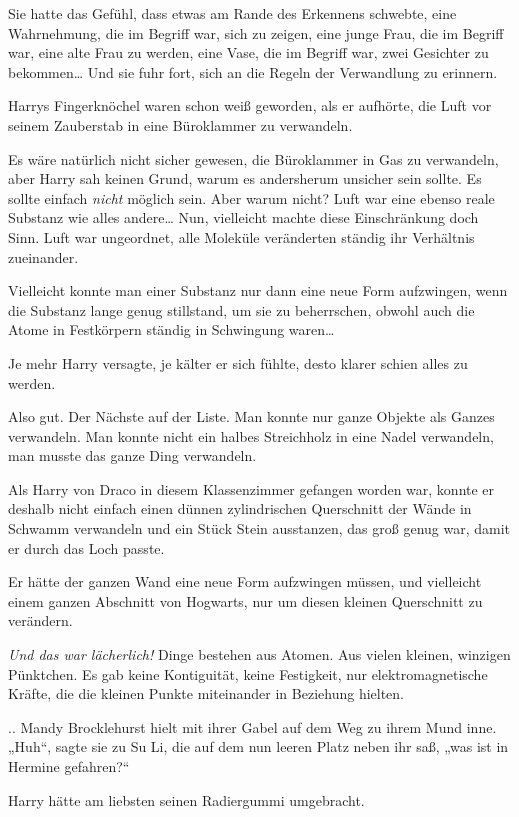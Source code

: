 {Sie hatte das Gefühl, dass etwas am Rande des Erkennens schwebte, eine Wahrnehmung, die im Begriff war, sich zu zeigen, eine junge Frau, die im Begriff war, eine alte Frau zu werden, eine Vase, die im Begriff war, zwei Gesichter zu bekommen… Und sie fuhr fort, sich an die Regeln der Verwandlung zu erinnern.

Harrys Fingerknöchel waren schon weiß geworden, als er aufhörte, die Luft vor seinem Zauberstab in eine Büroklammer zu verwandeln.

Es wäre natürlich nicht sicher gewesen, die Büroklammer in Gas zu verwandeln, aber Harry sah keinen Grund, warum es andersherum unsicher sein sollte. Es sollte einfach \emph{nicht} möglich sein. Aber warum nicht? Luft war eine ebenso reale Substanz wie alles andere… Nun, vielleicht machte diese Einschränkung doch Sinn. Luft war ungeordnet, alle Moleküle veränderten ständig ihr Verhältnis zueinander.

Vielleicht konnte man einer Substanz nur dann eine neue Form aufzwingen, wenn die Substanz lange genug stillstand, um sie zu beherrschen, obwohl auch die Atome in Festkörpern ständig in Schwingung waren…

Je mehr Harry versagte, je kälter er sich fühlte, desto klarer schien alles zu werden.

Also gut. Der Nächste auf der Liste. Man konnte nur ganze Objekte als Ganzes verwandeln. Man konnte nicht ein halbes Streichholz in eine Nadel verwandeln, man musste das ganze Ding verwandeln.

Als Harry von Draco in diesem Klassenzimmer gefangen worden war, konnte er deshalb nicht einfach einen dünnen zylindrischen Querschnitt der Wände in Schwamm verwandeln und ein Stück Stein ausstanzen, das groß genug war, damit er durch das Loch passte.

Er hätte der ganzen Wand eine neue Form aufzwingen müssen, und vielleicht einem ganzen Abschnitt von Hogwarts, nur um diesen kleinen Querschnitt zu verändern.

\emph{Und das war lächerlich!} Dinge bestehen aus Atomen. Aus vielen kleinen, winzigen Pünktchen. Es gab keine Kontiguität, keine Festigkeit, nur elektromagnetische Kräfte, die die kleinen Punkte miteinander in Beziehung hielten.

.. Mandy Brocklehurst hielt mit ihrer Gabel auf dem Weg zu ihrem Mund inne. „Huh“, sagte sie zu Su Li, die auf dem nun leeren Platz neben ihr saß, „was ist in Hermine gefahren?“

Harry hätte am liebsten seinen Radiergummi umgebracht.

}
